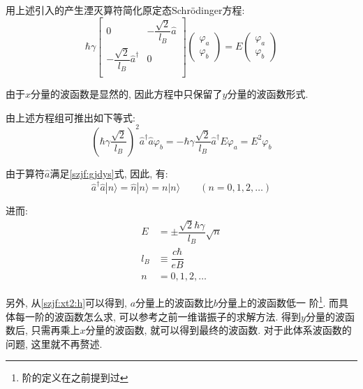 \documentclass[a4paper, 11pt]{article}
\begin{document}
\begin{spacing}{1.2}
        用上述引入的产生湮灭算符简化原定态Schr\"odinger方程:
        \begin{equation}
          \label{szjf:xt2:h}
            \hbar\gamma
            \begin{bmatrix}
              0        & -\dfrac{\sqrt{2}}{l_B}\hat{a}  \\
              -\dfrac{\sqrt{2}}{l_B}\hat{a}^{\dagger} & 0         \\
            \end{bmatrix}
            \left(\begin{array}{c}
              \varphi_a\\
              \varphi_b
            \end{array}\right)
            = E\left(\begin{array}{c}
              \varphi_a\\
              \varphi_b
            \end{array}\right)
        \end{equation}

        由于$x$分量的波函数是显然的, 因此方程中只保留了$y$分量的波函数形式. 

        由上述方程组可推出如下等式:
        \begin{equation}
          \left(\hbar\gamma\dfrac{\sqrt{2}}{l_B}\right)^2\hat{a}^{\dagger}\hat{a}\varphi_b = %
          -\hbar\gamma\dfrac{\sqrt{2}}{l_B}\hat{a}^{\dagger}E\varphi_a = %
          E^2\varphi_b
        \end{equation}

        由于算符$\hat{a}$满足\eqref{szjf:gjdys}式, 因此, 有:
        \begin{equation}
          \hat{a}^{\dagger}\hat{a}|n\rangle = \hat{n}|n\rangle = n|n\rangle%
          \qquad (n=0,1,2,\ldots)
        \end{equation} 

        进而:
        \begin{equation}
          \label{Dirac:ele}
          \begin{aligned}
            E &= \pm\dfrac{\sqrt{2}\hbar\gamma}{l_B}\sqrt{n}\\
            l_B &\equiv \dfrac{c\hbar}{eB}\\
            n &= 0,1,2,\ldots 
          \end{aligned}
        \end{equation}

        另外, 从\eqref{szjf:xt2:h}可以得到, $a$分量上的波函数比$b$分量上的波函数低一
        阶\footnote{阶的定义在之前提到过}. 而具体每一阶的波函数怎么求, 可以参考之前一维谐振子的求解方法. 
        得到$y$分量的波函数后, 只需再乘上$x$分量的波函数, 就可以得到最终的波函数. 
        对于此体系波函数的问题, 这里就不再赘述.


\end{spacing}
\end{document}
